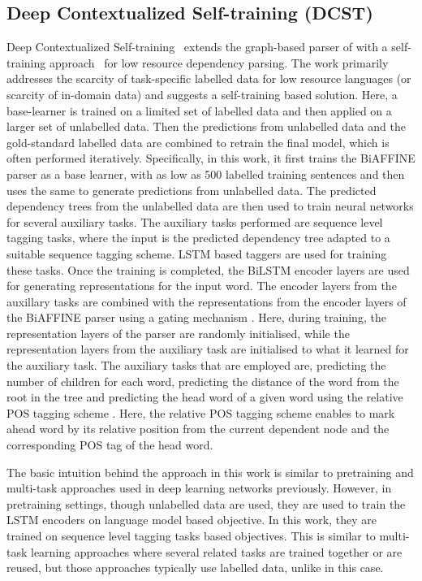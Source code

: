 \documentclass[11pt]{article}
\begin{document}
\subsection{Deep Contextualized Self-training (DCST)}
Deep Contextualized Self-training~\cite{rotman2019deep} extends the graph-based parser of  with a self-training approach~\cite{clark-etal-2018-semi,rybak2018semi} for low resource dependency parsing. The work primarily addresses the scarcity of task-specific labelled data for low resource languages (or scarcity of in-domain data) and suggests a self-training based solution. Here, a base-learner is trained on a limited set of labelled data and then applied on a larger set of unlabelled data. Then the  predictions from unlabelled data and the gold-standard labelled data are combined to retrain the final model, which is often performed iteratively.   Specifically, in this work, it first trains the BiAFFINE parser as a base learner, with as low as 500 labelled training sentences and then uses the same to generate predictions from unlabelled data. The predicted dependency trees from the unlabelled data are then used to train neural networks for several auxiliary tasks. The auxiliary tasks performed are sequence level tagging tasks, where the input is  the predicted dependency tree adapted to a suitable sequence tagging scheme. LSTM based taggers are used for training these tasks. Once the training is completed, the BiLSTM encoder layers are used for generating representations for the input word. The encoder layers from the auxillary tasks are combined with the representations from the encoder layers of the BiAFFINE parser using a gating mechanism \cite{sato-etal-2017-adversarial}.  Here, during training, the representation layers of the parser are randomly initialised, while the representation layers from the auxiliary task are initialised to what it learned for the auxiliary task. The auxiliary tasks that are employed are, predicting the number of children for each word, predicting the distance of the word from the root in the tree and predicting the head word of a given word using the relative POS tagging scheme \cite{rotman2019deep}. Here, the relative POS tagging scheme enables to mark ahead word by its relative position from the current dependent node and the corresponding POS tag of the head word. 

The basic intuition behind the approach in this work is similar to pretraining and multi-task approaches used in deep learning networks previously. However, in pretraining settings,  though unlabelled data are used, they are used to train the LSTM encoders on language model based objective. In this work, they are trained on sequence level tagging tasks based objectives.  This is similar to multi-task learning approaches  where several related tasks are trained together or are reused, but those approaches typically use labelled data, unlike in this case.
\end{document}
